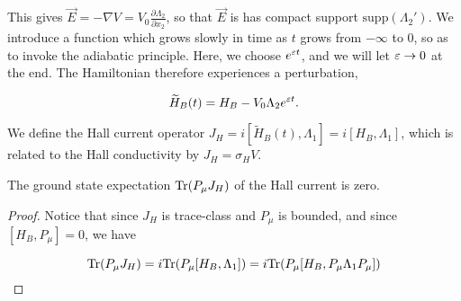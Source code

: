 \documentclass[12pt, letterpaper]{article}
\begin{document}
This gives $\vec{E}=-\nabla V = V_0\frac{\partial \Lambda_2}{\partial x_2}$, so that $\vec{E}$ is has compact support $\text{supp}(\Lambda_2')$. We introduce a function which grows slowly in time as $t$ grows from $-\infty$ to 0, so as to invoke the adiabatic principle. Here, we choose $e^{\varepsilon t}$, and we will let $\varepsilon\to 0$ at the end. The Hamiltonian therefore experiences a perturbation, 

\[\widetilde{H}_B(t) = H_B - V_0\Lambda_2 e^{\varepsilon t}.\]

We define the Hall current operator $J_H = i[\widetilde{H}_B(t), \Lambda_1] = i[H_B,\Lambda_1]$, which is related to the Hall conductivity by $J_H = \sigma_H V$. 

\begin{lemma}
The ground state expectation $\text{Tr}(P_\mu J_H)$ of the Hall current is zero.
\end{lemma}
\begin{proof}
Notice that since $J_H$ is trace-class and $P_\mu$ is bounded, and since $[H_B,P_\mu]=0$, we have 

\[\text{Tr}(P_\mu J_H) =i \text{Tr}(P_\mu [H_B, \Lambda_1]) = i\text{Tr}(P_\mu [H_B, P_\mu \Lambda_1P_\mu])\]

\end{proof}
\end{document}
